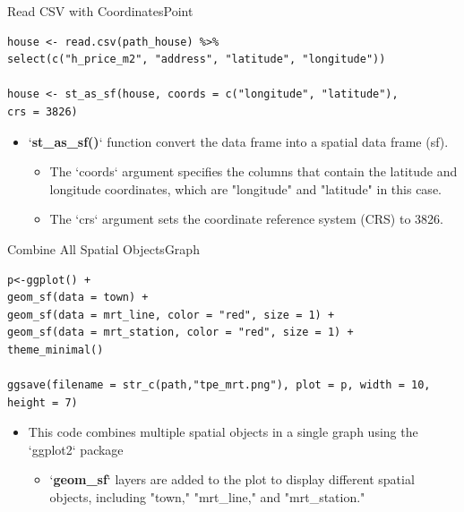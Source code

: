 \documentclass[hyperref={pdfpagelabels=false}]{beamer}
\begin{document}
\begin{frame}[fragile]{Read CSV with Coordinates}{Point}
\begin{lstlisting}
house <- read.csv(path_house) %>% 
select(c("h_price_m2", "address", "latitude", "longitude"))

house <- st_as_sf(house, coords = c("longitude", "latitude"), 
crs = 3826)
\end{lstlisting}
\begin{itemize}
	
	\item  `\textbf{st\_as\_sf()}` function convert the data frame into a spatial data frame (sf).
	\vspace{0.2cm}
	\begin{itemize}
		\item The `coords` argument specifies the columns that contain the latitude and longitude coordinates, which are "longitude" and "latitude" in this case.
			\vspace{0.2cm}
		\item The `crs` argument sets the coordinate reference system (CRS) to 3826.
	\end{itemize}
\end{itemize}
\end{frame}








\begin{frame}[fragile]{Combine All Spatial Objects}{Graph}
	
\begin{lstlisting}
p<-ggplot() + 
geom_sf(data = town) +
geom_sf(data = mrt_line, color = "red", size = 1) +
geom_sf(data = mrt_station, color = "red", size = 1) +
theme_minimal()

ggsave(filename = str_c(path,"tpe_mrt.png"), plot = p, width = 10, height = 7)
\end{lstlisting}
	\begin{itemize}
		
		\item This code combines multiple spatial objects in a single graph using the `ggplot2` package
		\vspace{0.2cm}
		\begin{itemize}
			\item `\textbf{geom\_sf}` layers are added to the plot to display different spatial objects, including "town," "mrt\_line," and "mrt\_station."				
		\end{itemize}
		
	\end{itemize}
\end{frame}
\end{document}

